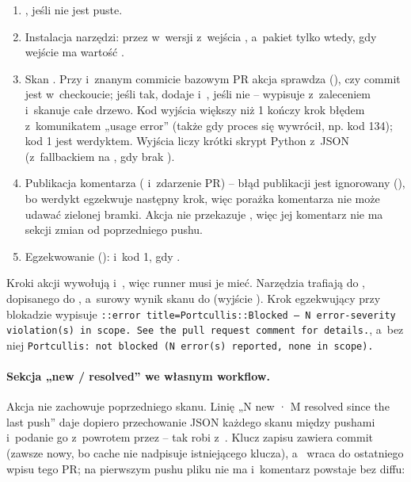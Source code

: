 \begin{enumerate}[leftmargin=*]
  \item {}, jeśli  nie jest puste.
  \item Instalacja narzędzi:  przez
         w~wersji z~wejścia , a~pakiet
         tylko wtedy, gdy wejście  ma wartość
        .
  \item Skan . Przy 
        i~znanym commicie bazowym PR akcja sprawdza (), czy commit
        jest w~checkoucie; jeśli tak, dodaje 
        i~, jeśli nie -- wypisuje 
        z~zaleceniem  i~skanuje całe drzewo. Kod wyjścia większy
        niż 1 kończy krok błędem z~komunikatem „usage error” (także gdy proces się wywrócił,
        np. kod 134); kod 1 jest werdyktem. Wyjścia liczy krótki
        skrypt Python z~JSON (z~fallbackiem na , gdy brak
        ).
  \item Publikacja komentarza ( i~zdarzenie PR) -- błąd publikacji
        jest ignorowany (), bo werdykt egzekwuje następny krok, więc
        porażka komentarza nie może udawać zielonej bramki. Akcja nie przekazuje
        , więc jej komentarz nie ma sekcji zmian od poprzedniego pushu.
  \item Egzekwowanie ():  i~kod 1, gdy
        .
\end{enumerate}

Kroki akcji wywołują  i~, więc runner musi je mieć.
Narzędzia trafiają do , dopisanego do ,
a~surowy wynik skanu do  (wyjście
). Krok egzekwujący przy blokadzie wypisuje
\texttt{::error title=Portcullis::Blocked — N error-severity violation(s) in scope. See the pull request comment for details.},
a~bez niej \texttt{Portcullis: not blocked (N error(s) reported, none in scope).}

\paragraph{Sekcja „new / resolved” we własnym workflow.} Akcja nie zachowuje poprzedniego
skanu. Linię „N new · M resolved since the last push” daje dopiero przechowanie JSON każdego
skanu między pushami i~podanie go z~powrotem przez  -- tak robi
 z~. Klucz zapisu zawiera commit
(zawsze nowy, bo cache nie nadpisuje istniejącego klucza), a~ wraca do
ostatniego wpisu tego PR; na pierwszym pushu pliku nie ma i~komentarz powstaje bez diffu:

